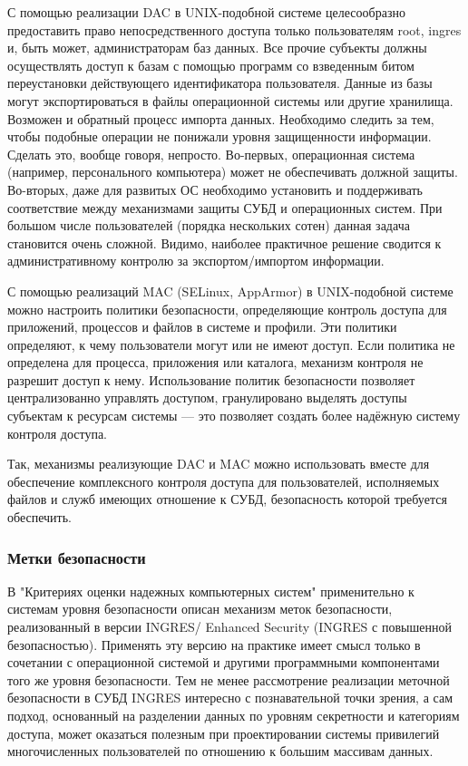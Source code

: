 С помощью реализации DAC в UNIX-подобной системе целесообразно предоставить право непосредственного доступа
только пользователям root, ingres и, быть может, администраторам баз данных. Все прочие
субъекты должны осуществлять доступ к базам с помощью программ со взведенным битом переустановки
действующего идентификатора пользователя.
Данные из базы могут экспортироваться в файлы операционной системы или другие хранилища. Возможен и
обратный процесс импорта данных. Необходимо следить за тем, чтобы подобные операции не понижали
уровня защищенности информации. Сделать это, вообще говоря, непросто. Во-первых, операционная
система (например, персонального компьютера) может не обеспечивать должной защиты. Во-вторых, даже
для развитых ОС необходимо установить и поддерживать соответствие между механизмами защиты СУБД и
операционных систем. При большом числе пользователей (порядка нескольких сотен) данная задача
становится очень сложной. Видимо, наиболее практичное решение сводится к административному контролю
за экспортом/импортом информации.

С помощью реализаций MAC (SELinux, AppArmor) в UNIX-подобной системе можно настроить политики безопасности,
определяющие контроль доступа для приложений, процессов и файлов в системе и профили. Эти политики
определяют, к чему пользователи могут или не имеют доступ. Если политика не определена для процесса,
приложения или каталога, механизм контроля не разрешит доступ к нему.
Использование политик безопасности позволяет централизованно управлять доступом, гранулировано
выделять доступы субъектам к ресурсам системы — это позволяет создать более надёжную систему
контроля доступа.

Так, механизмы реализующие DAC и MAC можно использовать вместе для обеспечение комплексного контроля доступа
для пользователей, исполняемых файлов и служб имеющих отношение к СУБД, безопасность которой требуется
обеспечить.


\subsubsection{Метки безопасности}

В "Критериях оценки надежных компьютерных систем" применительно к системам уровня безопасности
описан механизм меток безопасности, реализованный в версии INGRES/ Enhanced Security (INGRES с
повышенной безопасностью). Применять эту версию на практике имеет смысл только в сочетании с
операционной системой и другими программными компонентами того же уровня безопасности. Тем не менее
рассмотрение реализации меточной безопасности в СУБД INGRES интересно с познавательной точки
зрения, а сам подход, основанный на разделении данных по уровням секретности и категориям доступа,
может оказаться полезным при проектировании системы привилегий многочисленных пользователей по
отношению к большим массивам данных.

